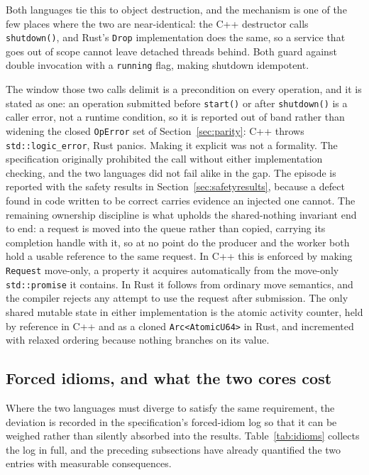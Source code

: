 \documentclass[english,twoside,openright,a4paper,censored,csm,software-track-2020]{HYthesisML}
\begin{document}
Both languages tie this to object destruction, and the mechanism is one of the few places
where the two are near-identical: the C++ destructor calls \texttt{shutdown()}, and Rust's
\texttt{Drop} implementation does the same, so a service that goes out of scope cannot leave
detached threads behind. Both guard against double invocation with a \texttt{running} flag,
making shutdown idempotent.

The window those two calls delimit is a precondition on every operation, and it is stated as one:
an operation submitted before \texttt{start()} or after \texttt{shutdown()} is a caller error, not
a runtime condition, so it is reported out of band rather than widening the closed
\texttt{OpError} set of Section~\ref{sec:parity}: C++ throws \texttt{std::logic\_error}, Rust
panics. Making it explicit was not a formality. The specification originally prohibited the call
without either implementation checking, and the two languages did not fail alike in the gap. The
episode is reported with the safety results in Section~\ref{sec:safetyresults}, because a defect
found in code written to be correct carries evidence an injected one cannot. The remaining ownership discipline is what upholds the
shared-nothing invariant end to end: a request is moved into the queue rather than copied,
carrying its completion handle with it, so at no point do the producer and the worker both
hold a usable reference to the same request. In C++ this is enforced by making
\texttt{Request} move-only, a property it acquires automatically from the move-only
\texttt{std::promise} it contains. In Rust it follows from ordinary move semantics, and the
compiler rejects any attempt to use the request after submission. The only shared mutable
state in either implementation is the atomic activity counter, held by reference in C++ and
as a cloned \texttt{Arc<AtomicU64>} in Rust, and incremented with relaxed ordering because
nothing branches on its value.

\subsection{Forced idioms, and what the two cores cost}
\label{sec:idioms}
Where the two languages must diverge to satisfy the same requirement, the deviation is
recorded in the specification's forced-idiom log so that it can be weighed rather than
silently absorbed into the results. Table~\ref{tab:idioms} collects the log in full, and the
preceding subsections have already quantified the two entries with measurable consequences.
\end{document}
